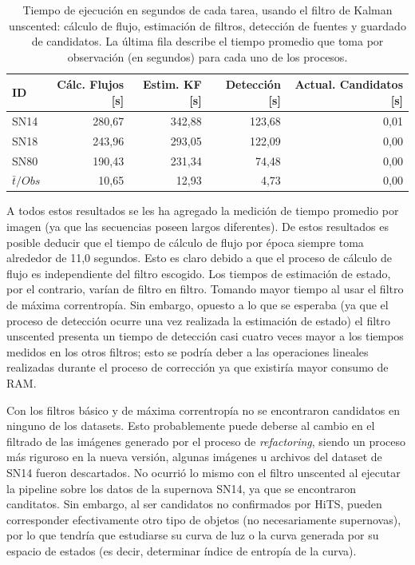 \begin{table}[h!]
\centering
\caption{Tiempo de ejecuci\'on en segundos de cada tarea, usando el filtro de Kalman unscented: c\'alculo de flujo, estimaci\'on de filtros, detecci\'on de fuentes y guardado de candidatos. La \'ultima fila describe el tiempo promedio que toma por observaci\'on (en segundos) para cada uno de los procesos.}
\begin{tabular}{|l|r|r|r|r|}
\hline
\textbf{ID} & \textbf{C\'alc. Flujos [s]} & \textbf{Estim. KF [s]} &  \textbf{Detecci\'on [s]}  & \textbf{Actual. Candidatos [s]}\\ \hline \hline
SN14        & 280,67            & 342,88        &  123,68 & 0,01 \\ \hline
SN18            & 243,96             & 293,05         &  122,09  & 0,00\\ \hline
SN80            & 190,43             & 231,34         &   74,48 & 0,00 \\ \hline \hline
$\bar{t}/Obs$ & 10,65 &  12,93 & 4,73 & 0,00\\\hline 
\end{tabular}
\label{tab:t11}
\end{table}
A todos estos resultados se les ha agregado la medici\'on de tiempo promedio por imagen (ya que las secuencias poseen largos diferentes). De estos resultados es posible deducir que el tiempo de c\'alculo de flujo por \'epoca siempre toma alrededor de 11,0 segundos. Esto es claro debido a que el proceso de c\'alculo de flujo es independiente del filtro escogido. Los tiempos de estimaci\'on de estado, por el contrario, var\'ian de filtro en filtro. Tomando mayor tiempo al usar el filtro de m\'axima correntrop\'ia. Sin embargo, opuesto a lo que se esperaba (ya que el proceso de detecci\'on ocurre una vez realizada la estimaci\'on de estado) el filtro unscented presenta un tiempo de detecci\'on casi cuatro veces mayor a los tiempos medidos en los otros filtros; esto se podr\'ia deber a las operaciones lineales realizadas durante el proceso de correcci\'on ya que existir\'ia mayor consumo de RAM. 
\bigskip

Con los filtros b\'asico y de m\'axima correntrop\'ia no se encontraron candidatos en ninguno de los datasets. Esto probablemente puede deberse al cambio en el filtrado de las im\'agenes generado por el proceso de \textit{refactoring}, siendo un proceso m\'as riguroso en la nueva versi\'on, algunas im\'agenes u archivos del dataset de SN14 fueron descartados. No ocurri\'o lo mismo con el filtro unscented al ejecutar la pipeline sobre los datos de la supernova SN14, ya que se encontraron canditatos. Sin embargo, al ser candidatos no confirmados por HiTS, pueden corresponder efectivamente otro tipo de objetos (no necesariamente supernovas), por lo que tendr\'ia que estudiarse su curva de luz o la curva generada por su espacio de estados (es decir, determinar \'indice de entrop\'ia de la curva).
\bigskip

